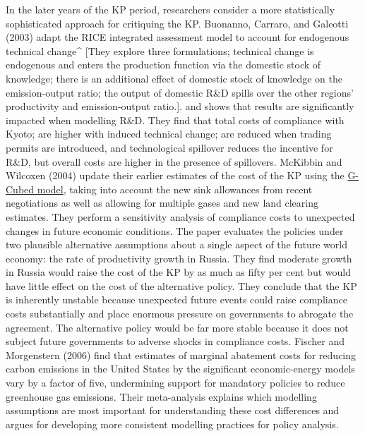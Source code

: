 \documentclass[
  10pt,
]{article}
\begin{document}
In the later years of the KP period, researchers consider a more
statistically sophisticated approach for critiquing the KP. Buonanno,
Carraro, and Galeotti (2003) adapt the RICE integrated assessment model
to account for endogenous technical change\^{} {[}They explore three
formulations; technical change is endogenous and enters the production
function via the domestic stock of knowledge; there is an additional
effect of domestic stock of knowledge on the emission-output ratio; the
output of domestic R\&D spills over the other regions' productivity and
emission-output ratio.{]}. and shows that results are significantly
impacted when modelling R\&D. They find that total costs of compliance
with Kyoto; are higher with induced technical change; are reduced when
trading permits are introduced, and technological spillover reduces the
incentive for R\&D, but overall costs are higher in the presence of
spillovers. McKibbin and Wilcoxen (2004) update their earlier estimates
of the cost of the KP using the
\href{https://unfccc.int/topics/mitigation/workstreams/response-measures/modelling-tools-to-assess-the-impact-of-the-implementation-of-response-measures/response-measures-models-g-cubed}{G-Cubed
model}, taking into account the new sink allowances from recent
negotiations as well as allowing for multiple gases and new land
clearing estimates. They perform a sensitivity analysis of compliance
costs to unexpected changes in future economic conditions. The paper
evaluates the policies under two plausible alternative assumptions about
a single aspect of the future world economy: the rate of productivity
growth in Russia. They find moderate growth in Russia would raise the
cost of the KP by as much as fifty per cent but would have little effect
on the cost of the alternative policy. They conclude that the KP is
inherently unstable because unexpected future events could raise
compliance costs substantially and place enormous pressure on
governments to abrogate the agreement. The alternative policy would be
far more stable because it does not subject future governments to
adverse shocks in compliance costs. Fischer and Morgenstern (2006) find
that estimates of marginal abatement costs for reducing carbon emissions
in the United States by the significant economic-energy models vary by a
factor of five, undermining support for mandatory policies to reduce
greenhouse gas emissions. Their meta-analysis explains which modelling
assumptions are most important for understanding these cost differences
and argues for developing more consistent modelling practices for policy
analysis.
\end{document}
